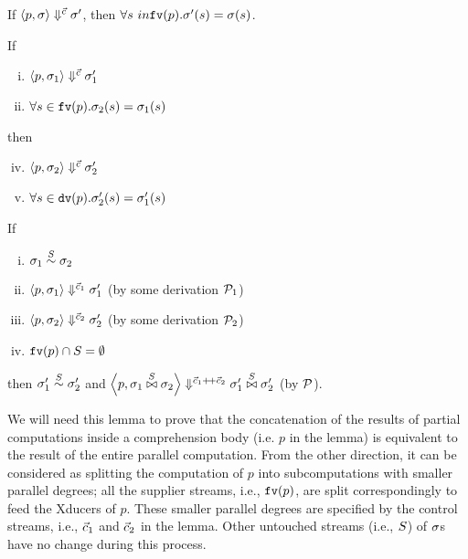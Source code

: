 \begin{lem}\label{lem-}
	If $\seval{p}{\sgm}{\c}{\sgm'}$, then $\forall s \ in \FV{p}. \sgm'(s) = \sgm(s)$.
\end{lem}

\begin{lem} \label{lem-emp-join}
	If 
	\begin{enumerate} [(i)]
		\item $\seval{p}{\sgm_1}{\c}{\sgm_1'}$
		\item $\forall s \in \FV{p}. \sgm_2(s) = \sgm_1(s)$
	\end{enumerate}
	then 
	\begin{enumerate}[(i)]
		\setcounter{enumi}{3}
		\item $\seval{p}{\sgm_2}{\c}{\sgm_2'}$
		\item $\forall s \in \dv{p}. \sgm_2'(s) = \sgm_1'(s)$
	\end{enumerate}
\end{lem}


\begin{lem}  \label{lem-sgm-join}
	If 
	\begin{enumerate}[(i)]
		\item $\sgm_1 \~{\S} \sgm_2$
		\item $\seval{p}{\sgm_1}{\c_1}{\sgm_1'}$ (by some derivation $\MP_1$)
		\item $	\seval{p}{\sgm_2} {\c_2} {\sgm_2'}$ (by some derivation $\MP_2$)
		\item $\FV{p} \cap \S = \emptyset $
	\end{enumerate}
	then $\sgm_1' \~\S \sgm_2'$ and $\seval{p}{\sgm_1 \x\S \sgm_2}{\c_1 {\++} \c_2}{ \sgm_1' \x\S \sgm_2' }$ (by $\MP$).
\end{lem}

We will need this lemma to prove that the concatenation of the results of partial computations inside a comprehension body (i.e. $p$ in the lemma) is equivalent to the result of the entire parallel computation. 
From the other direction, it can be considered as splitting the computation of $p$ into subcomputations with smaller parallel degrees; all the supplier streams, i.e., $\FV{p}$, are split correspondingly to
feed the Xducers of $p$. 
These smaller parallel degrees are specified by the control streams, i.e., $\c_1$ and $\c_2$ in the lemma. 
Other untouched streams (i.e., $\S$) of $\sgm$s  have no change during this process.\\

